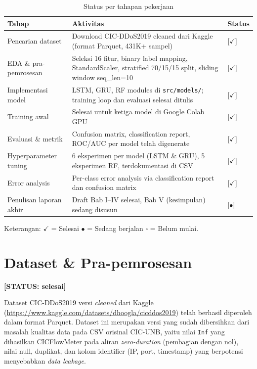 \documentclass[11pt,a4paper,oneside]{report}
\newcommand{\statusbox}[1]{\textbf{[STATUS: #1]}}
\begin{document}
\begin{table}[h!]
\centering
\caption{Status per tahapan pekerjaan}
\label{tab:status-tahapan}
\begin{tabularx}{\textwidth}{lXl}
\toprule
\textbf{Tahap} & \textbf{Aktivitas} & \textbf{Status} \\
\midrule
Pencarian dataset      & Download CIC-DDoS2019 cleaned dari Kaggle (format Parquet, 431K+ sampel)       & [$\checkmark$] \\
EDA \& pra-pemrosesan  & Seleksi 16 fitur, binary label mapping, StandardScaler, stratified 70/15/15 split, sliding window seq\_len=10       & [$\checkmark$] \\
Implementasi model     & LSTM, GRU, RF modules di \texttt{src/models/}; training loop dan evaluasi selesai ditulis       & [$\checkmark$] \\
Training awal          & Selesai untuk ketiga model di Google Colab GPU       & [$\checkmark$] \\
Evaluasi \& metrik     & Confusion matrix, classification report, ROC/AUC per model telah digenerate       & [$\checkmark$] \\
Hyperparameter tuning  & 6 eksperimen per model (LSTM \& GRU), 5 eksperimen RF, terdokumentasi di CSV       & [$\checkmark$] \\
Error analysis         & Per-class error analysis via classification report dan confusion matrix       & [$\checkmark$] \\
Penulisan laporan akhir & Draft Bab I--IV selesai, Bab V (kesimpulan) sedang disusun       & [$\bullet$] \\
\bottomrule
\end{tabularx}
\end{table}

\noindent Keterangan: $\checkmark$ = Selesai \quad $\bullet$ = Sedang berjalan \quad $\square$ = Belum mulai.

\section{Dataset \& Pra-pemrosesan}

\statusbox{selesai}

Dataset CIC-DDoS2019 versi \textit{cleaned} dari Kaggle (\url{https://www.kaggle.com/datasets/dhoogla/cicddos2019}) telah berhasil diperoleh dalam format Parquet. Dataset ini merupakan versi yang sudah dibersihkan dari masalah kualitas data pada CSV orisinal CIC-UNB, yaitu nilai \texttt{Inf} yang dihasilkan CICFlowMeter pada aliran \textit{zero-duration} (pembagian dengan nol), nilai null, duplikat, dan kolom identifier (IP, port, timestamp) yang berpotensi menyebabkan \textit{data leakage}.
\end{document}

